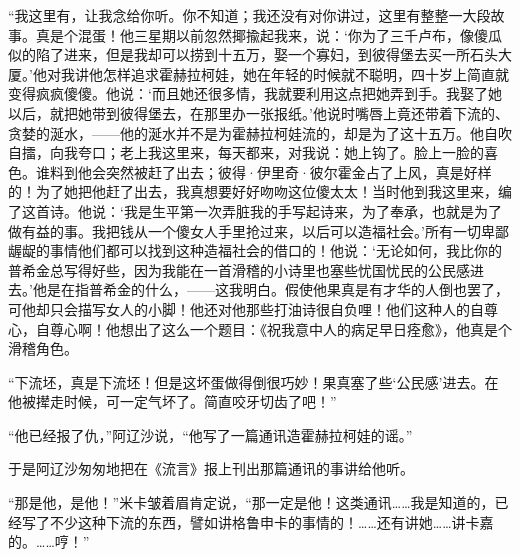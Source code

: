 \par “我这里有，让我念给你听。你不知道；我还没有对你讲过，这里有整整一大段故事。真是个混蛋！他三星期以前忽然揶揄起我来，说：‘你为了三千卢布，像傻瓜似的陷了进来，但是我却可以捞到十五万，娶一个寡妇，到彼得堡去买一所石头大厦。’他对我讲他怎样追求霍赫拉柯娃，她在年轻的时候就不聪明，四十岁上简直就变得疯疯傻傻。他说：‘而且她还很多情，我就要利用这点把她弄到手。我娶了她以后，就把她带到彼得堡去，在那里办一张报纸。’他说时嘴唇上竟还带着下流的、贪婪的涎水，——他的涎水并不是为霍赫拉柯娃流的，却是为了这十五万。他自吹自擂，向我夸口；老上我这里来，每天都来，对我说：她上钩了。脸上一脸的喜色。谁料到他会突然被赶了出去；彼得·伊里奇·彼尔霍金占了上风，真是好样的！为了她把他赶了出去，我真想要好好吻吻这位傻太太！当时他到我这里来，编了这首诗。他说：‘我是生平第一次弄脏我的手写起诗来，为了奉承，也就是为了做有益的事。我把钱从一个傻女人手里抢过来，以后可以造福社会。’所有一切卑鄙龌龊的事情他们都可以找到这种造福社会的借口的！他说：‘无论如何，我比你的普希金总写得好些，因为我能在一首滑稽的小诗里也塞些忧国忧民的公民感进去。’他是在指普希金的什么，——这我明白。假使他果真是有才华的人倒也罢了，可他却只会描写女人的小脚！他还对他那些打油诗很自负哩！他们这种人的自尊心，自尊心啊！他想出了这么一个题目：《祝我意中人的病足早日痊愈》，他真是个滑稽角色。
\par “下流坯，真是下流坯！但是这坏蛋做得倒很巧妙！果真塞了些‘公民感’进去。在他被撵走时候，可一定气坏了。简直咬牙切齿了吧！”
\par “他已经报了仇，”阿辽沙说，“他写了一篇通讯造霍赫拉柯娃的谣。”
\par 于是阿辽沙匆匆地把在《流言》报上刊出那篇通讯的事讲给他听。
\par “那是他，是他！”米卡皱着眉肯定说，“那一定是他！这类通讯……我是知道的，已经写了不少这种下流的东西，譬如讲格鲁申卡的事情的！……还有讲她……讲卡嘉的。……哼！”
